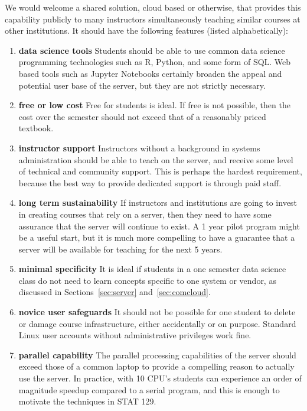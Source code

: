\documentclass[12pt]{article}
\begin{document}
We would welcome a shared solution, cloud based or otherwise, that provides this capability publicly to many instructors simultaneously teaching similar courses at other institutions.
It should have the following features (listed alphabetically):
\begin{enumerate}
\item \textbf{data science tools} Students should be able to use common data science programming technologies such as R, Python, and some form of SQL.
    Web based tools such as Jupyter Notebooks certainly broaden the appeal and potential user base of the server, but they are not strictly necessary.
\item \textbf{free or low cost} Free for students is ideal.
    If free is not possible, then the cost over the semester should not exceed that of a reasonably priced textbook.
\item \textbf{instructor support}
    Instructors without a background in systems administration should be able to teach on the server, and receive some level of technical and community support.
    This is perhaps the hardest requirement, because the best way to provide dedicated support is through paid staff.
\item \textbf{long term sustainability} 
    If instructors and institutions are going to invest in creating courses that rely on a server, then they need to have some assurance that the server will continue to exist.
    A 1 year pilot program might be a useful start, but it is much more compelling to have a guarantee that a server will be available for teaching for the next 5 years.
\item \textbf{minimal specificity}
    It is ideal if students in a one semester data science class do not need to learn concepts specific to one system or vendor, as discussed in Sections~\ref{sec:server} and~\ref{sec:comcloud}.
\item \textbf{novice user safeguards} It should not be possible for one student to delete or damage course infrastructure, either accidentally or on purpose.
    Standard Linux user accounts without administrative privileges work fine.
\item \textbf{parallel capability}
    The parallel processing capabilities of the server should exceed those of a common laptop to provide a compelling reason to actually use the server.
    In practice, with 10 CPU's students can experience an order of magnitude speedup compared to a serial program, and this is enough to motivate the techniques in STAT 129.

\end{enumerate}
\end{document}
